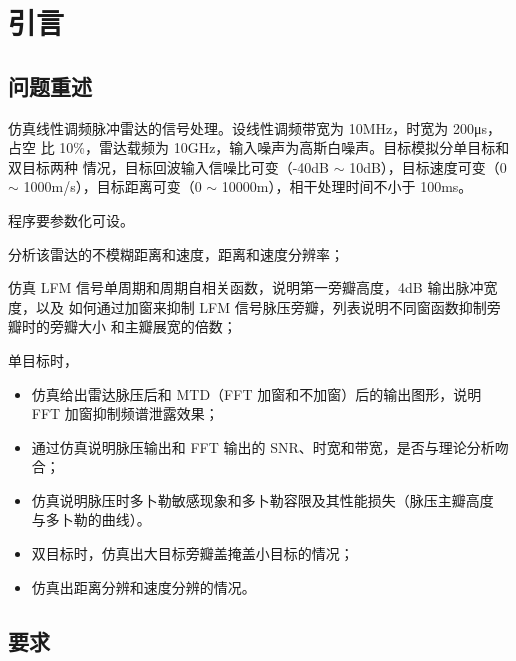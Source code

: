 \documentclass[../main]{subfiles}
\begin{document}
\chapter{引言}%
\label{cha:introduction}

\section{问题重述}%
\label{sec:problem}

仿真线性调频脉冲雷达的信号处理。设线性调频带宽为 10MHz，时宽为 200μs，占空
比 10\%，雷达载频为 10GHz，输入噪声为高斯白噪声。目标模拟分单目标和双目标两种
情况，目标回波输入信噪比可变（-40dB $\sim$ 10dB），目标速度可变（0 $\sim$
1000m/s），目标距离可变（0 $\sim$ 10000m），相干处理时间不小于 100ms。

程序要参数化可设。

\begin{Exercise}
  分析该雷达的不模糊距离和速度，距离和速度分辨率；
\end{Exercise}

\begin{Exercise}
  仿真 LFM 信号单周期和周期自相关函数，说明第一旁瓣高度，4dB 输出脉冲宽度，以及
  如何通过加窗来抑制 LFM 信号脉压旁瓣，列表说明不同窗函数抑制旁瓣时的旁瓣大小
  和主瓣展宽的倍数；
\end{Exercise}

\begin{Exercise}
  单目标时，
  \begin{itemize}
    \item 仿真给出雷达脉压后和 MTD（FFT 加窗和不加窗）后的输出图形，说明 FFT
      加窗抑制频谱泄露效果；
    \item 通过仿真说明脉压输出和 FFT 输出的 SNR、时宽和带宽，是否与理论分析吻
      合；
    \item 仿真说明脉压时多卜勒敏感现象和多卜勒容限及其性能损失（脉压主瓣高度
      与多卜勒的曲线）。
  \end{itemize}
\end{Exercise}

\begin{Exercise}
  \begin{itemize}
    \item 双目标时，仿真出大目标旁瓣盖掩盖小目标的情况；
    \item 仿真出距离分辨和速度分辨的情况。
  \end{itemize}
\end{Exercise}

\section{要求}%
\label{sec:requirement}
\end{document}
